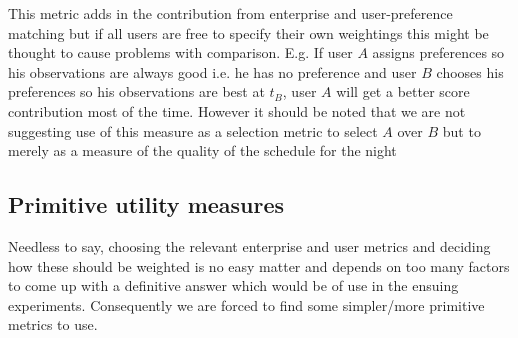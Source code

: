 This metric adds in the contribution from enterprise and user-preference matching but if all users are free to specify their own weightings this might be thought to cause problems with comparison. E.g. If user $A$ assigns preferences so his observations are always good i.e. he has no preference and user $B$ chooses his preferences so his observations are best at $t_B$, user $A$ will get a better score contribution most of the time. However it should be noted that we are not suggesting use of this measure as a selection metric to select $A$ over $B$ but to merely as a measure of the quality of the schedule for the night




\subsection{Primitive utility measures}
Needless to say, choosing the relevant enterprise and user metrics and deciding how these should be weighted is no easy matter and depends on too many factors to come up with a definitive answer which would be of use in the ensuing experiments. Consequently we are forced to find some simpler/more primitive metrics to use. 

